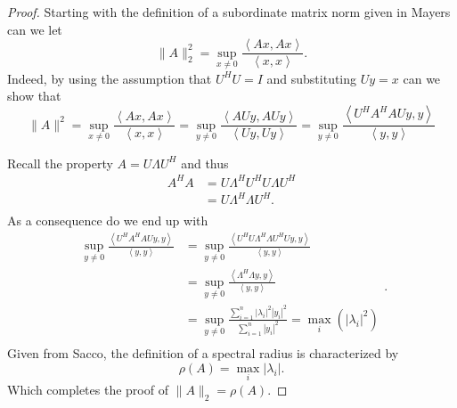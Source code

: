 \documentclass{article}
\theoremstyle{remark}
\newcommand{\newpara}
  {
  \vskip 0.4cm
  }
\begin{document}
\begin{proof}
  Starting with the definition of a subordinate matrix norm given in Mayers \cite{sul} can we let \[
  \|A\|_{2}^{2} = \sup_{x \neq 0} \frac{\left<Ax, Ax \right>}{ \left<x,x \right>} .
  \] 
   Indeed, by using the assumption that $U^{H} U = I$ and substituting $Uy =  x$ can we show that \[
    \|A\|_{}^{2} = \sup_{x \neq 0} \frac{\left<Ax, Ax \right>}{\left<x,x \right>}  = \sup_{y\neq 0}  \frac{\left<AU y, A U y \right>}{ \left<U y, Uy \right>} = \sup_{y \neq 0} \frac{\left<U^{H} A^{H} A U y,y \right>}{\left<y,y \right>} 
  \] 
  \newpara
  Recall the property $A = U \Lambda  U^{H}$ and thus
  \[
    \begin{split}
  A^{H} A   & = U \Lambda ^{H} U^{H} U \Lambda U^{H}  \\
   & = U \Lambda ^{H} \Lambda U^{H}.   \\
    \end{split} 
  \] 
  As a consequence do we end up with \[
    \begin{split}
  \sup_{y \neq 0} \frac{\left<U^{H} A^{H} A U y, y  \right>}{\left<y,y \right>}   & = \sup_{y\neq 0}  \frac{\left<U^{H} U \Lambda ^{H} \Lambda  U^{H} U  y, y\right>}{ \left<y,y \right>}  \\
  &=  \sup_{y \neq 0} \frac{\left<\Lambda ^{H} \Lambda  y, y \right>}{\left<y,y \right>}  \\  
  &=   \sup_{ y \neq 0}  \frac{\sum_{i=1}^{n}  \left\lvert \lambda _{i} \right\rvert ^2  \left| y_{i} \right|^2}{ \sum_{i=1}^{n}  \left| y_{i} \right|^2}  = \max _{i} \left( \left\lvert \lambda_{i}  \right\rvert ^{2}  \right)  \\
    \end{split} .
  \] 
  Given from Sacco\cite{qu}, the definition of a spectral radius is characterized by \[
  \rho \left( A \right) = \max_{i} \left\lvert \lambda_{i}  \right\rvert    .
  \] 
  Which completes the proof of $ \|A\|_{2} = \rho \left( A \right)$.
   
\end{proof}


\end{document}
